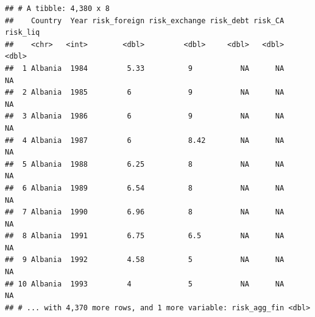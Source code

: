 \documentclass[11pt,]{article}
\newenvironment{Shaded}{\begin{snugshade}}{\end{snugshade}}
\newcommand{\KeywordTok}[1]{\textcolor[rgb]{0.13,0.29,0.53}{\textbf{#1}}}
\newcommand{\DataTypeTok}[1]{\textcolor[rgb]{0.13,0.29,0.53}{#1}}
\newcommand{\StringTok}[1]{\textcolor[rgb]{0.31,0.60,0.02}{#1}}
\newcommand{\OperatorTok}[1]{\textcolor[rgb]{0.81,0.36,0.00}{\textbf{#1}}}
\newcommand{\NormalTok}[1]{#1}
\begin{document}
\begin{Shaded}
\end{Shaded}

\begin{verbatim}
## # A tibble: 4,380 x 8
##    Country  Year risk_foreign risk_exchange risk_debt risk_CA risk_liq
##    <chr>   <int>        <dbl>         <dbl>     <dbl>   <dbl>    <dbl>
##  1 Albania  1984         5.33          9           NA      NA       NA
##  2 Albania  1985         6             9           NA      NA       NA
##  3 Albania  1986         6             9           NA      NA       NA
##  4 Albania  1987         6             8.42        NA      NA       NA
##  5 Albania  1988         6.25          8           NA      NA       NA
##  6 Albania  1989         6.54          8           NA      NA       NA
##  7 Albania  1990         6.96          8           NA      NA       NA
##  8 Albania  1991         6.75          6.5         NA      NA       NA
##  9 Albania  1992         4.58          5           NA      NA       NA
## 10 Albania  1993         4             5           NA      NA       NA
## # ... with 4,370 more rows, and 1 more variable: risk_agg_fin <dbl>
\end{verbatim}
\end{document}
